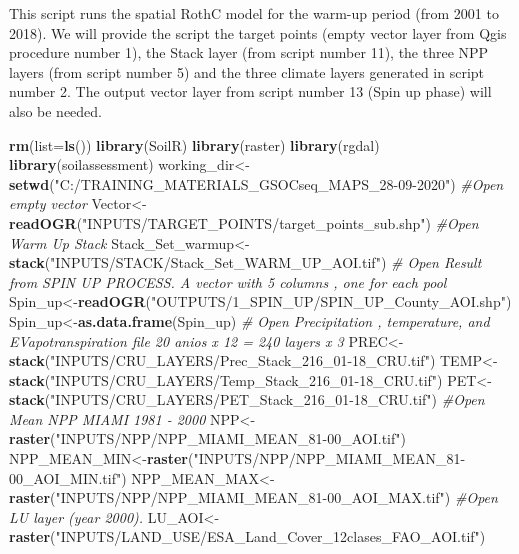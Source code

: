 \documentclass[
  10pt,
  b5paper,
]{book}
\newenvironment{Shaded}{\begin{snugshade}}{\end{snugshade}}
\newcommand{\CommentTok}[1]{\textcolor[rgb]{0.56,0.35,0.01}{\textit{#1}}}
\newcommand{\DataTypeTok}[1]{\textcolor[rgb]{0.13,0.29,0.53}{#1}}
\newcommand{\KeywordTok}[1]{\textcolor[rgb]{0.13,0.29,0.53}{\textbf{#1}}}
\newcommand{\NormalTok}[1]{#1}
\newcommand{\StringTok}[1]{\textcolor[rgb]{0.31,0.60,0.02}{#1}}
\begin{document}
This script runs the spatial RothC model for the warm-up period (from 2001 to 2018). We will provide the script the target points (empty vector layer from Qgis procedure number 1), the Stack layer (from script number 11), the three NPP layers (from script number 5) and the three climate layers generated in script number 2. The output vector layer from script number 13 (Spin up phase) will also be needed.

\begin{Shaded}
\begin{Highlighting}[]
\KeywordTok{rm}\NormalTok{(}\DataTypeTok{list=}\KeywordTok{ls}\NormalTok{()) }
\KeywordTok{library}\NormalTok{(SoilR)}
\KeywordTok{library}\NormalTok{(raster)}
\KeywordTok{library}\NormalTok{(rgdal)}
\KeywordTok{library}\NormalTok{(soilassessment)}
\NormalTok{working_dir<-}\KeywordTok{setwd}\NormalTok{(}\StringTok{"C:/TRAINING_MATERIALS_GSOCseq_MAPS_28-09-2020"}\NormalTok{)}
\CommentTok{#Open empty vector}
\NormalTok{Vector<-}\KeywordTok{readOGR}\NormalTok{(}\StringTok{"INPUTS/TARGET_POINTS/target_points_sub.shp"}\NormalTok{)}
\CommentTok{#Open Warm Up Stack}
\NormalTok{Stack_Set_warmup<-}\StringTok{ }\KeywordTok{stack}\NormalTok{(}\StringTok{"INPUTS/STACK/Stack_Set_WARM_UP_AOI.tif"}\NormalTok{)}
\CommentTok{# Open Result from SPIN UP PROCESS. A vector with 5 columns , one for each pool}
\NormalTok{Spin_up<-}\KeywordTok{readOGR}\NormalTok{(}\StringTok{"OUTPUTS/1_SPIN_UP/SPIN_UP_County_AOI.shp"}\NormalTok{)}
\NormalTok{Spin_up<-}\KeywordTok{as.data.frame}\NormalTok{(Spin_up)}
\CommentTok{# Open Precipitation , temperature, and EVapotranspiration file 20 anios x 12 = 240 layers x 3}
\NormalTok{PREC<-}\KeywordTok{stack}\NormalTok{(}\StringTok{"INPUTS/CRU_LAYERS/Prec_Stack_216_01-18_CRU.tif"}\NormalTok{)}
\NormalTok{TEMP<-}\KeywordTok{stack}\NormalTok{(}\StringTok{"INPUTS/CRU_LAYERS/Temp_Stack_216_01-18_CRU.tif"}\NormalTok{)}
\NormalTok{PET<-}\KeywordTok{stack}\NormalTok{(}\StringTok{"INPUTS/CRU_LAYERS/PET_Stack_216_01-18_CRU.tif"}\NormalTok{)}
\CommentTok{#Open Mean NPP MIAMI 1981 - 2000}
\NormalTok{NPP<-}\KeywordTok{raster}\NormalTok{(}\StringTok{"INPUTS/NPP/NPP_MIAMI_MEAN_81-00_AOI.tif"}\NormalTok{)}
\NormalTok{NPP_MEAN_MIN<-}\KeywordTok{raster}\NormalTok{(}\StringTok{"INPUTS/NPP/NPP_MIAMI_MEAN_81-00_AOI_MIN.tif"}\NormalTok{)}
\NormalTok{NPP_MEAN_MAX<-}\KeywordTok{raster}\NormalTok{(}\StringTok{"INPUTS/NPP/NPP_MIAMI_MEAN_81-00_AOI_MAX.tif"}\NormalTok{)}
\CommentTok{#Open LU layer (year 2000).}
\NormalTok{LU_AOI<-}\KeywordTok{raster}\NormalTok{(}\StringTok{"INPUTS/LAND_USE/ESA_Land_Cover_12clases_FAO_AOI.tif"}\NormalTok{)}
\end{Highlighting}
\end{Shaded}
\end{document}
